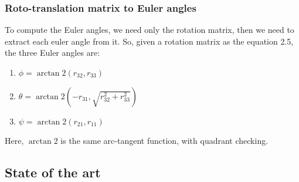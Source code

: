 \subsubsection*{Roto-translation matrix to Euler angles}
To compute the Euler angles, we need only the rotation matrix, then we need to extract each euler angle from it.
So, given a rotation matrix as the equation 2.5, the three Euler angles are:
\begin{enumerate}
    \item $\phi = \arctan2(r_{32}, r_{33})$
    \item $\theta = \arctan2(-r_{31}, \sqrt{r_{32}^2 + r_{33}^2})$
    \item $\psi = \arctan2(r_{21}, r_{11})$
\end{enumerate}
Here, $\arctan2$ is the same arc-tangent function, with quadrant checking. 

\subsection{State of the art}\label{subsec:state-of-the-art}

